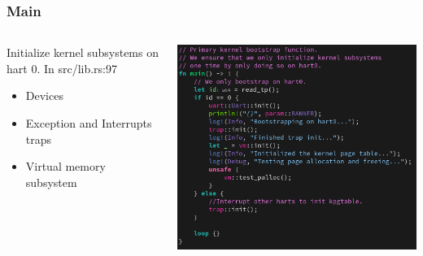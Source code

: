 \documentclass{beamer}
\begin{document}
\begin{frame}
  \frametitle{Main}
  \begin{columns}
    \begin{column}{0.5\textwidth}
      Initialize kernel subsystems on hart 0.
      In src/lib.rs:97
      \begin{itemize}
      \item Devices\\
      \item Exception and Interrupts traps\\
      \item Virtual memory subsystem
      \end{itemize}
    \end{column}
    \begin{column}{0.5\textwidth}
      \includegraphics[width=\textwidth]{main.png}
    \end{column}
  \end{columns}
\end{frame}
\end{document}
